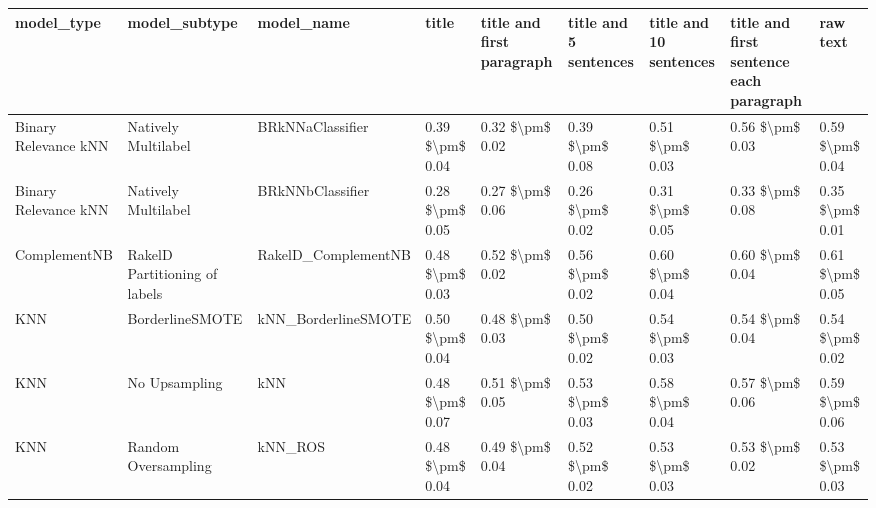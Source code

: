 \begin{tabular}{lllllllll}
\toprule
                     model\_type &                 model\_subtype &                                   model\_name &           title & title and first paragraph & title and 5 sentences & title and 10 sentences & title and first sentence each paragraph &            raw text \\
\midrule
           Binary Relevance kNN &           Natively Multilabel &                             BRkNNaClassifier & 0.39 \$\textbackslash pm\$ 0.04 &           0.32 \$\textbackslash pm\$ 0.02 &       0.39 \$\textbackslash pm\$ 0.08 &        0.51 \$\textbackslash pm\$ 0.03 &                         0.56 \$\textbackslash pm\$ 0.03 &     0.59 \$\textbackslash pm\$ 0.04 \\
           Binary Relevance kNN &           Natively Multilabel &                             BRkNNbClassifier & 0.28 \$\textbackslash pm\$ 0.05 &           0.27 \$\textbackslash pm\$ 0.06 &       0.26 \$\textbackslash pm\$ 0.02 &        0.31 \$\textbackslash pm\$ 0.05 &                         0.33 \$\textbackslash pm\$ 0.08 &     0.35 \$\textbackslash pm\$ 0.01 \\
                   ComplementNB & RakelD Partitioning of labels &                          RakelD\_ComplementNB & 0.48 \$\textbackslash pm\$ 0.03 &           0.52 \$\textbackslash pm\$ 0.02 &       0.56 \$\textbackslash pm\$ 0.02 &        0.60 \$\textbackslash pm\$ 0.04 &                         0.60 \$\textbackslash pm\$ 0.04 &     0.61 \$\textbackslash pm\$ 0.05 \\
                            KNN &               BorderlineSMOTE &                          kNN\_BorderlineSMOTE & 0.50 \$\textbackslash pm\$ 0.04 &           0.48 \$\textbackslash pm\$ 0.03 &       0.50 \$\textbackslash pm\$ 0.02 &        0.54 \$\textbackslash pm\$ 0.03 &                         0.54 \$\textbackslash pm\$ 0.04 &     0.54 \$\textbackslash pm\$ 0.02 \\
                            KNN &                 No Upsampling &                                          kNN & 0.48 \$\textbackslash pm\$ 0.07 &           0.51 \$\textbackslash pm\$ 0.05 &       0.53 \$\textbackslash pm\$ 0.03 &        0.58 \$\textbackslash pm\$ 0.04 &                         0.57 \$\textbackslash pm\$ 0.06 &     0.59 \$\textbackslash pm\$ 0.06 \\
                            KNN &           Random Oversampling &                                      kNN\_ROS & 0.48 \$\textbackslash pm\$ 0.04 &           0.49 \$\textbackslash pm\$ 0.04 &       0.52 \$\textbackslash pm\$ 0.02 &        0.53 \$\textbackslash pm\$ 0.03 &                         0.53 \$\textbackslash pm\$ 0.02 &     0.53 \$\textbackslash pm\$ 0.03 \\

\end{tabular}
